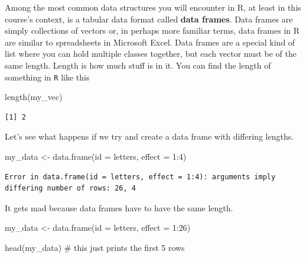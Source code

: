 \documentclass[
  letterpaper,
  DIV=11,
  numbers=noendperiod,
  oneside]{scrreprt}
\newenvironment{Shaded}{\begin{snugshade}}{\end{snugshade}}
\newcommand{\AttributeTok}[1]{\textcolor[rgb]{0.40,0.45,0.13}{#1}}
\newcommand{\CommentTok}[1]{\textcolor[rgb]{0.37,0.37,0.37}{#1}}
\newcommand{\DecValTok}[1]{\textcolor[rgb]{0.68,0.00,0.00}{#1}}
\newcommand{\FunctionTok}[1]{\textcolor[rgb]{0.28,0.35,0.67}{#1}}
\newcommand{\NormalTok}[1]{\textcolor[rgb]{0.00,0.23,0.31}{#1}}
\newcommand{\OtherTok}[1]{\textcolor[rgb]{0.00,0.23,0.31}{#1}}
\newcommand{\SpecialCharTok}[1]{\textcolor[rgb]{0.37,0.37,0.37}{#1}}
\begin{document}
Among the most common data structures you will encounter in R, at least
in this course's context, is a tabular data format called \textbf{data
frames}. Data frames are simply collections of vectors or, in perhaps
more familiar terms, data frames in R are similar to spreadsheets in
Microsoft Excel. Data frames are a special kind of list where you can
hold multiple classes together, but each vector must be of the same
length. Length is how much stuff is in it. You can find the length of
something in \texttt{R} like this

\begin{Shaded}
\begin{Highlighting}[]
\FunctionTok{length}\NormalTok{(my\_vec)}
\end{Highlighting}
\end{Shaded}

\begin{verbatim}
[1] 2
\end{verbatim}

Let's see what happens if we try and create a data frame with differing
lengths.

\begin{Shaded}
\begin{Highlighting}[]
\NormalTok{my\_data }\OtherTok{\textless{}{-}} \FunctionTok{data.frame}\NormalTok{(}\AttributeTok{id =}\NormalTok{ letters,}
                      \AttributeTok{effect =} \DecValTok{1}\SpecialCharTok{:}\DecValTok{4}\NormalTok{)}
\end{Highlighting}
\end{Shaded}

\begin{verbatim}
Error in data.frame(id = letters, effect = 1:4): arguments imply differing number of rows: 26, 4
\end{verbatim}

It gets mad because data frames have to have the same length.

\begin{Shaded}
\begin{Highlighting}[]
\NormalTok{my\_data }\OtherTok{\textless{}{-}} \FunctionTok{data.frame}\NormalTok{(}\AttributeTok{id =}\NormalTok{ letters,}
                      \AttributeTok{effect =} \DecValTok{1}\SpecialCharTok{:}\DecValTok{26}\NormalTok{)}

\FunctionTok{head}\NormalTok{(my\_data) }\CommentTok{\# this just prints the first 5 rows}
\end{Highlighting}
\end{Shaded}
\end{document}
